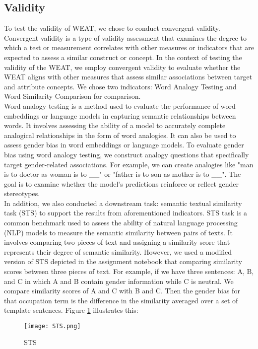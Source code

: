 \documentclass[11pt]{article}
\begin{document}
\subsection{Validity}
To test the validity of WEAT, we chose to conduct convergent validity. Convergent validity is a type of validity assessment that examines the degree to which a test or measurement correlates with other measures or indicators that are expected to assess a similar construct or concept. In the context of testing the validity of the WEAT, we employ convergent validity to evaluate whether the WEAT aligns with other measures that assess similar associations between target and attribute concepts. We chose two indicators: Word Analogy Testing and Word Similarity Comparison for comparison.\\
Word analogy testing is a method used to evaluate the performance of word embeddings or language models in capturing semantic relationships between words. It involves assessing the ability of a model to accurately complete analogical relationships in the form of word analogies. It can also be used to assess gender bias in word embeddings or language models. To evaluate gender bias using word analogy testing, we construct analogy questions that specifically target gender-related associations. For example, we can create analogies like "man is to doctor as woman is to \_\_" or "father is to son as mother is to \_\_". The goal is to examine whether the model's predictions reinforce or reflect gender stereotypes. \\
In addition, we also conducted a downstream task: semantic textual similarity task (STS) to support the results from aforementioned indicators. STS task is a common benchmark used to assess the ability of natural language processing (NLP) models to measure the semantic similarity between pairs of texts. It involves comparing two pieces of text and assigning a similarity score that represents their degree of semantic similarity. However, we used a modified version of STS depicted in the assignment notebook that comparing similarity scores between three pieces of text. For example, if we have three sentences: A, B, and C in which A and B contain gender information while C is neutral. We compare similarity scores of A and C with B and C. Then the gender bias for that occupation term is the  difference in the similarity averaged over a set of template sentences. Figure \ref{fig:STS} illustrates this: 

\begin{figure}[htbp]
  \centering
  \texttt{[image: STS.png]}
  \caption{STS}
  \label{fig:STS}
\end{figure}
\end{document}
